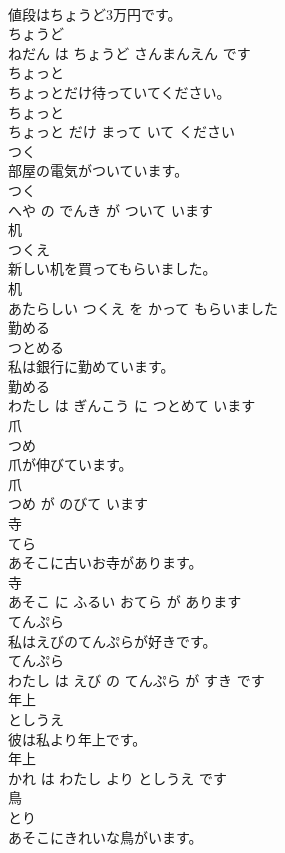 \documentclass[8pt]{extreport}
\begin{document}
\begin{CJK}{UTF8}{min}
\\	値段はちょうど3万円です。	
\\	ちょうど 
\\	ねだん は ちょうど さんまんえん です			
\\	ちょっと	
\\	ちょっとだけ待っていてください。	
\\	ちょっと 
\\	ちょっと だけ まって いて ください			
\\	つく	
\\	部屋の電気がついています。	
\\	つく 
\\	へや の でんき が ついて います			
\\	机	
\\	つくえ			
\\	新しい机を買ってもらいました。	
\\	机 
\\	あたらしい つくえ を かって もらいました			
\\	勤める	
\\	つとめる			
\\	私は銀行に勤めています。	
\\	勤める 
\\	わたし は ぎんこう に つとめて います			
\\	爪	
\\	つめ			
\\	爪が伸びています。	
\\	爪 
\\	つめ が のびて います			
\\	寺	
\\	てら			
\\	あそこに古いお寺があります。	
\\	寺 
\\	あそこ に ふるい おてら が あります			
\\	てんぷら	
\\	私はえびのてんぷらが好きです。	
\\	てんぷら 
\\	わたし は えび の てんぷら が すき です			
\\	年上	
\\	としうえ			
\\	彼は私より年上です。	
\\	年上 
\\	かれ は わたし より としうえ です			
\\	鳥	
\\	とり			
\\	あそこにきれいな鳥がいます。	

\end{CJK}
\end{document}
